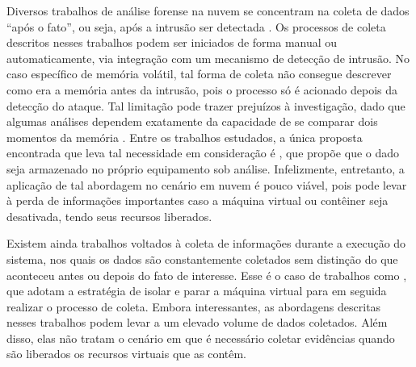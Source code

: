 Diversos trabalhos de análise forense na nuvem se concentram na coleta de dados ``após o fato'', ou seja, após a intrusão ser detectada \cite{ReichertAutoAcquisition:2015,PoiselVMI:2013,DykstraFROST:2013,GeorgeDF2CE:2012,SangLogApproach:2013}. 
%
Os processos de coleta descritos nesses trabalhos podem ser iniciados de forma manual ou automaticamente, via integração com um mecanismo de detecção de intrusão. 
%
No caso específico de memória volátil, tal forma de coleta não consegue descrever como era a memória antes da intrusão, pois o processo só é acionado depois da detecção do ataque. 
%
Tal limitação pode trazer prejuízos à investigação, dado que algumas análises dependem exatamente da capacidade de se comparar dois momentos da memória \cite{CaseMemoryForensics:2014}. 
%
Entre os trabalhos estudados, a única proposta encontrada que leva tal necessidade em consideração é \cite{DezfouliBackupApproach:2012}, que propõe que o dado seja armazenado no próprio equipamento sob análise.
%
Infelizmente, entretanto, a aplicação de tal abordagem no cenário em nuvem é pouco viável, pois pode levar à perda de informações importantes caso a máquina virtual ou contêiner seja desativada, tendo seus recursos liberados.
%

Existem ainda trabalhos voltados à coleta de informações durante a execução do sistema, nos quais os dados são constantemente coletados sem distinção do que aconteceu antes ou depois do fato de interesse.
%
Esse é o caso de trabalhos como \cite{PoiselVMI:2013,DykstraFROST:2013,SangLogApproach:2013,Dolan-GavittSemanticGap:2011}, que adotam a estratégia de isolar e parar a máquina virtual para em seguida realizar o processo de coleta. 
%
Embora interessantes, as abordagens descritas nesses trabalhos podem levar a um elevado volume de dados coletados.
%
Além disso, elas não tratam o cenário em que é necessário coletar evidências quando são liberados os recursos virtuais que as contêm.


